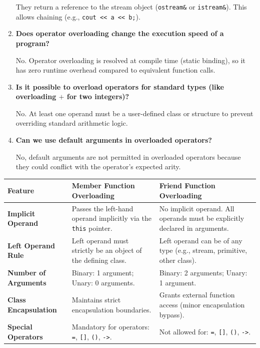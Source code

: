 \documentclass[12pt,a4paper]{article}
\newcommand{\Q}[1]{\textbf{#1}\par\noindent\ignorespaces}
\renewcommand{\arraystretch}{1.45}
\begin{document}
\begin{tcolorbox}[exambox, title={\textbf{Frequently Asked / Viva Questions}}]
\begin{enumerate}[topsep=0pt, label=\textbf{Q\arabic*.}, itemsep=5pt]
    They return a reference to the stream object (\texttt{ostream\&} or \texttt{istream\&}). This allows chaining (e.g., \texttt{cout << a << b;}).
  \item \Q{Does operator overloading change the execution speed of a program?}
    No. Operator overloading is resolved at compile time (static binding), so it has zero runtime overhead compared to equivalent function calls.
  \item \Q{Is it possible to overload operators for standard types (like overloading $+$ for two integers)?}
    No. At least one operand must be a user-defined class or structure to prevent overriding standard arithmetic logic.
  \item \Q{Can we use default arguments in overloaded operators?}
    No, default arguments are not permitted in overloaded operators because they could conflict with the operator's expected arity.
\end{enumerate}
\end{tcolorbox}

\begin{tcolorbox}[tikzbox, title={Comparison: Member Functions vs. Friend Functions for Overloading}]
\renewcommand{\arraystretch}{1.45}
\par\noindent
\begin{tabularx}{\linewidth}{|B{3.2cm}|Y|Y|}
\hline
\textbf{Feature} & \textbf{\color{myteal}Member Function Overloading} & \textbf{\color{myamber}Friend Function Overloading} \\
\hline
\textbf{Implicit Operand} & Passes the left-hand operand implicitly via the \texttt{this} pointer. & No implicit operand. All operands must be explicitly declared in arguments. \\
\hline
\textbf{Left Operand Rule} & Left operand must strictly be an object of the defining class. & Left operand can be of any type (e.g., stream, primitive, other class). \\
\hline
\textbf{Number of Arguments} & Binary: 1 argument; Unary: 0 arguments. & Binary: 2 arguments; Unary: 1 argument. \\
\hline
\textbf{Class Encapsulation} & Maintains strict encapsulation boundaries. & Grants external function access (minor encapsulation bypass). \\
\hline
\textbf{Special Operators} & Mandatory for operators: \texttt{=}, \texttt{[]}, \texttt{()}, \texttt{->}. & Not allowed for: \texttt{=}, \texttt{[]}, \texttt{()}, \texttt{->}. \\
\hline
\end{tabularx}
\end{tcolorbox}
\end{document}
